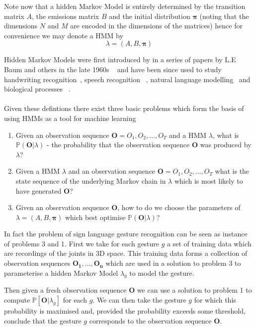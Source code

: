 Note now that a hidden Markov Model is entirely determined by the transition matrix $A$, the emissions matrix $B$ and the initial distribution $\bm{\pi}$ (noting that the dimensions $N$ and $M$ are encoded in the dimensions of the matrices) hence for convenience we may denote a HMM by
\begin{equation*}
\lambda = (A,B, \bm{\pi})
\end{equation*}

Hidden Markov Models were first introduced by in a series of papers by L.E Baum and others in the late 1960s ~\citep{baum1966statistical,baum1970maximization} and have been since used to study handwriting recognition~\citep{bunke1995off}, speech recognition ~\citep{juang1991hidden, jelinek1998statistical}, natural language modelling~\citep{manning1999foundations, jurafsky2002speech} and biological processes ~\citep{krogh1994hidden, durbin1998biological, lio1998models}.
\\
\\
Given these defintions there exist three basic problems which form the basis of using HMMs as a tool for machine learning
\begin{enumerate}
\item Given an observation sequence $\bm{O} = O_1,O_2,\dots,O_T$ and a HMM $\lambda$, what is $\mathbb{P}(\bm{O}|\lambda)$ - the probability that the observation sequence $\bm{O}$ was produced by $\lambda$?
\item Given a HMM $\lambda$ and an observation sequence $\bm{O} = O_1,O_2,\dots,O_T $ what is the state sequence of the underlying Markov chain in $\lambda$ which is most likely to have generated $\bm{O}$?
\item Given an observation sequence $\bm{O}$, how to do we choose the parameters of $\lambda = (A,B,\bm{\pi})$ which best optimise $\mathbb{P}(\bm{O}|\lambda)$?
\end{enumerate}

In fact the problem of sign language gesture recognition can be seen as instance of problems 3 and 1. First we take for each gesture $g$ a set of training data which are recordings of the joints in 3D space. This training data forms a collection of observation sequences $\bm{O_1}, \dots, \bm{O_n}$ which are used in a solution to problem 3 to parameterise a hidden Markov Model $\lambda_g$ to model the gesture.

Then given a fresh observation sequence $\bm{O}$ we can use a solution to problem 1 to compute $\mathbb{P}[\bm{O} | \lambda_g]$ for each $g$. We can then take the gesture $g$ for which this probability is maximised and, provided the probability exceeds some threshold, conclude that the gesture $g$ corresponds to the observation sequence $\bm{O}$. 

